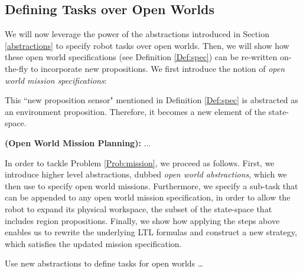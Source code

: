 \subsection{Defining Tasks over Open Worlds}

We will now leverage the power of the abstractions introduced in Section \ref{abstractions} to specify robot tasks over open worlds. Then, we will show how these open world specifications (see Definition \ref{Def:spec}) can be re-written on-the-fly to incorporate new propositions. We first introduce the notion of \emph{open world mission specifications}:

\begin{myDefinition}\label{Def:spec}
	\end{myDefinition} 
This ``new proposition sensor" mentioned in Definition \ref{Def:spec} is abstracted as an environment proposition. Therefore, it becomes a new element of the state-space.

\begin{myProblem}\label{Prob:mission}
	\textbf{(Open World Mission Planning):}
	...
\end{myProblem}

In order to tackle Problem \ref{Prob:mission}, we proceed as follows. First, we introduce higher level abstractions, dubbed \emph{open world abstractions}, %
which we then use to specify open world missions. Furthermore, we specify a sub-task that can be appended to any open world mission specification, in order to allow the robot to expand its physical workspace, the subset of the state-space that includes region propositions. Finally, we  show how applying the steps above enables us to rewrite the underlying LTL formulas and construct a new strategy, which satisfies the updated mission specification. 

Use new abstractions to define tasks for open worlds \ldots

